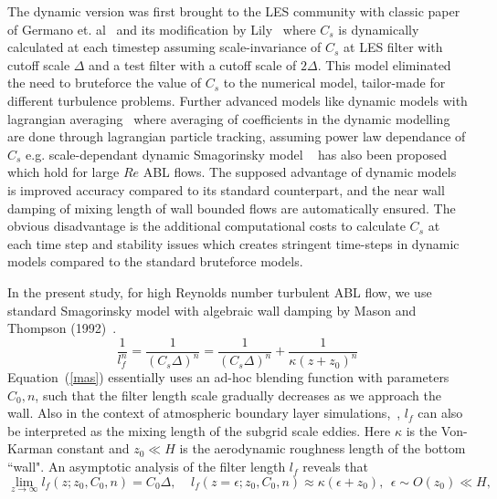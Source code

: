 The dynamic version was first brought to the LES community with classic paper of Germano et. al~\cite{germano} and its modification by Lily~\cite{lily} where $C_s$ is dynamically calculated at each timestep assuming scale-invariance of $C_s$ at LES filter with cutoff scale $\Delta$ and a test filter with a cutoff scale of $2\Delta$. This model eliminated the need to bruteforce the value of $C_s$ to the numerical model, tailor-made for different turbulence problems. Further advanced models like dynamic models with lagrangian averaging~\cite{mene1} where averaging of coefficients in the dynamic modelling are done through lagrangian particle tracking, assuming power law dependance of $C_s$ e.g. scale-dependant dynamic Smagorinsky model ~\cite{porte1fun,bou1} has also been proposed which hold for large $Re$ ABL flows. The supposed advantage of dynamic models is improved accuracy compared to its standard counterpart, and the near wall damping of mixing length of wall bounded flows are automatically ensured. The obvious disadvantage is the additional computational costs to calculate $C_s$ at each time step and stability issues which creates stringent time-steps in dynamic models compared to the standard bruteforce models.\\
\par
In the present study, for high Reynolds number turbulent ABL flow, we use standard Smagorinsky model with algebraic wall damping by Mason and Thompson (1992)~\cite{mason}.
\begin{equation}
\frac{1}{l_f^{n}} = \frac{1}{(C_s\Delta)^{n}} = \frac{1}{(C_s\Delta)^{n}} + \frac{1}{\kappa(z + z_0)^{n}} \label{mas}
\end{equation} 
Equation~(\ref{mas}) essentially uses an ad-hoc blending function with parameters $C_0, n$, such that the filter length scale gradually decreases as we approach the wall. Also in the context of atmospheric boundary layer simulations,~\cite{mason_callen,mason}, $l_f$ can also be interpreted as the mixing length of the subgrid scale eddies. Here $\kappa$ is the Von-Karman constant and $z_0 \ll H$ is the aerodynamic roughness length of the bottom ``wall". An asymptotic analysis of the filter length $l_f$ reveals that
\begin{equation}
\lim_{z \rightarrow \infty} l_{f} (z; z_0, C_0,n) = C_0 \Delta, \ \ \ \ \  l_{f} (z = \epsilon; z_0, C_0,n) \approx \kappa (\epsilon + z_0),\ \ \epsilon \sim O(z_0) \ll H, \label{mas2}
\end{equation}
